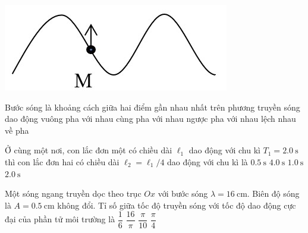 \begin{ex}
	{\includegraphics[scale=0.65]{../figs/G11-FINAL-SEM1-001-2}}
	\loigiai{}
\end{ex}
\begin{ex}
	Bước sóng là khoảng cách giữa hai điểm gần nhau nhất trên phương truyền sóng dao động
	\choice
	{vuông pha với nhau}
	{\True cùng pha với nhau}
	{ngược pha với nhau}
	{lệch nhau về pha}
	\loigiai{}
\end{ex}
\begin{ex}
	Ở cùng một nơi, con lắc đơn một có chiều dài $\ell_1$ dao động với chu kì $T_1=\SI{2.0}{\second}$ thì con lắc đơn hai có chiều dài $\ell_2=\ell_1/4$ dao động với chu kì là
	\choice
	{$\SI{0.5}{\second}$}
	{$\SI{4.0}{\second}$}
	{\True $\SI{1.0}{\second}$}
	{$\SI{2.0}{\second}$}
\end{ex}
\begin{ex}
	Một sóng ngang truyền dọc theo trục $Ox$ với bước sóng $\lambda=\SI{16}{\centi\meter}$. Biên độ sóng là $A=\SI{0.5}{\centi\meter}$ không đổi. Tỉ số giữa tốc độ truyền sóng với tốc độ dao động cực đại của phần tử môi trường là
	\choice
	{$\dfrac{1}{6}$}
	{\True $\dfrac{16}{\pi}$}
	{$\dfrac{\pi}{10}$}
	{$\dfrac{\pi}{4}$}
\end{ex}
